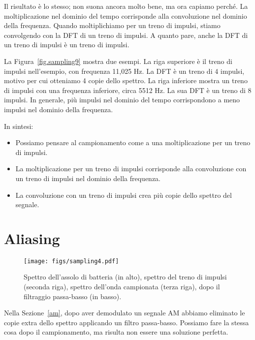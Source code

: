 \documentclass[12pt,a4paper]{book}
\begin{document}
Il risultato è lo stesso; non suona ancora molto bene, ma ora capiamo perché. La moltiplicazione nel dominio del tempo corrisponde alla convoluzione nel dominio della frequenza. Quando moltiplichiamo per un treno di impulsi, stiamo convolgendo con la DFT di un treno di impulsi. A quanto pare, anche la DFT di un treno di impulsi è un treno di impulsi.

La Figura~\ref{fig.sampling9} mostra due esempi. La riga superiore è il treno di impulsi nell'esempio, con frequenza 11,025 Hz. La DFT è un treno di 4 impulsi, motivo per cui otteniamo 4 copie dello spettro. La riga inferiore mostra un treno di impulsi con una frequenza inferiore, circa 5512 Hz. La sua DFT è un treno di 8 impulsi. In generale, più impulsi nel dominio del tempo corrispondono a meno impulsi nel dominio della frequenza.

In sintesi:

\begin{itemize} 

\item Possiamo pensare al campionamento come a una moltiplicazione per un treno di impulsi.

\item La moltiplicazione per un treno di impulsi corrisponde alla convoluzione con un treno di impulsi nel dominio della frequenza.

\item La convoluzione con un treno di impulsi crea più copie dello spettro del segnale.

\end{itemize} 

\section{Aliasing} 

\begin{figure} 

\centerline{\texttt{[image: figs/sampling4.pdf]}} \caption{Spettro dell'assolo di batteria (in alto), spettro del treno di impulsi (seconda riga), spettro dell'onda campionata (terza riga), dopo il filtraggio passa-basso (in basso).} \label{fig.sampling4} \end{figure} 

Nella Sezione~\ref{am}, dopo aver demodulato un segnale AM abbiamo eliminato le copie extra dello spettro applicando un filtro passa-basso. Possiamo fare la stessa cosa dopo il campionamento, ma risulta non essere una soluzione perfetta.
\end{document}
